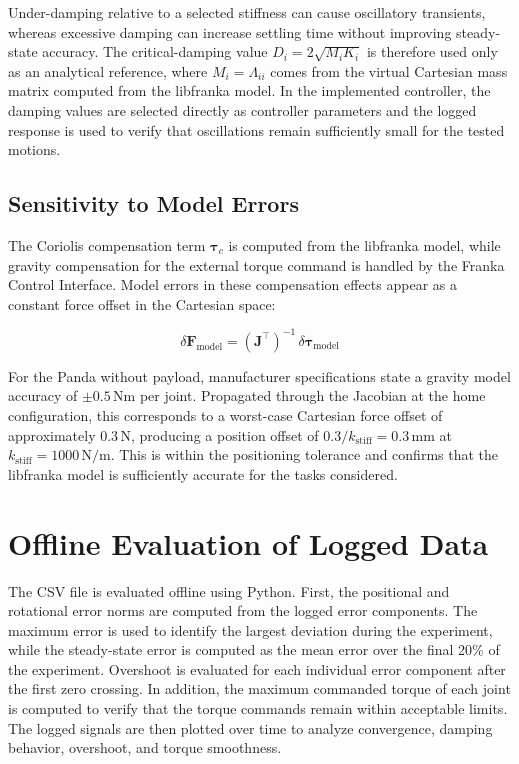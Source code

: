 Under-damping relative to a selected stiffness can cause oscillatory
transients, whereas excessive damping can increase settling time without
improving steady-state accuracy. The critical-damping value
$D_i = 2\sqrt{M_iK_i}$ is therefore used only as an analytical
reference, where \(M_i=\Lambda_{ii}\) comes from the virtual Cartesian mass
matrix computed from the libfranka model. In the implemented controller, the damping values are selected
directly as controller parameters and the logged response is used to verify
that oscillations remain sufficiently small for the tested motions.

\subsection{Sensitivity to Model Errors}

The Coriolis compensation term $\bm{\tau}_c$ is computed from the libfranka
model, while gravity compensation for the external torque command is handled by
the Franka Control Interface.
Model errors in these compensation effects appear as a constant force offset in
the Cartesian space:

\begin{equation}
\delta\mathbf{F}_{\mathrm{model}} =
(\mathbf{J}^\top)^{-1}\,\delta\bm{\tau}_{\mathrm{model}}
\end{equation}

For the Panda without payload, manufacturer specifications state
a gravity model accuracy of $\pm0.5\,\mathrm{Nm}$ per joint.
Propagated through the Jacobian at the home configuration, this
corresponds to a worst-case Cartesian force offset of approximately
$0.3\,\mathrm{N}$, producing a position offset of
$0.3/k_{\mathrm{stiff}} = 0.3\,\mathrm{mm}$ at
$k_{\mathrm{stiff}}=1000\,\mathrm{N/m}$.
This is within the positioning tolerance and confirms that the
libfranka model is sufficiently accurate for the tasks considered.

\section{Offline Evaluation of Logged Data}
\label{sec:offline_evaluation}

The CSV file is evaluated offline using Python.
First, the positional and rotational error norms are computed from the logged error components.
The maximum error is used to identify the largest deviation during the experiment, while the steady-state error is computed as the mean error over the final 20\% of the experiment.
Overshoot is evaluated for each individual error component after the first zero crossing.
In addition, the maximum commanded torque of each joint is computed to verify that the torque commands remain within acceptable limits.
The logged signals are then plotted over time to analyze convergence, damping behavior, overshoot, and torque smoothness.

